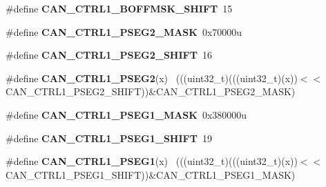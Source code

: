 \begin{DoxyCompactItemize}
\item 
\hypertarget{group___c_a_n___register___masks_ga9f3df553dda57c9cb36c599ee20bc598}{}\#define {\bfseries C\+A\+N\+\_\+\+C\+T\+R\+L1\+\_\+\+B\+O\+F\+F\+M\+S\+K\+\_\+\+S\+H\+I\+F\+T}~15\label{group___c_a_n___register___masks_ga9f3df553dda57c9cb36c599ee20bc598}

\item 
\hypertarget{group___c_a_n___register___masks_ga204a1f6435e791f02d599543020b4b15}{}\#define {\bfseries C\+A\+N\+\_\+\+C\+T\+R\+L1\+\_\+\+P\+S\+E\+G2\+\_\+\+M\+A\+S\+K}~0x70000u\label{group___c_a_n___register___masks_ga204a1f6435e791f02d599543020b4b15}

\item 
\hypertarget{group___c_a_n___register___masks_ga667a8faa98245aa9fa5afc6e71b7f640}{}\#define {\bfseries C\+A\+N\+\_\+\+C\+T\+R\+L1\+\_\+\+P\+S\+E\+G2\+\_\+\+S\+H\+I\+F\+T}~16\label{group___c_a_n___register___masks_ga667a8faa98245aa9fa5afc6e71b7f640}

\item 
\hypertarget{group___c_a_n___register___masks_gaca5a6aa4c0a109e51dc0b26f59b840a4}{}\#define {\bfseries C\+A\+N\+\_\+\+C\+T\+R\+L1\+\_\+\+P\+S\+E\+G2}(x)                                          ~(((uint32\+\_\+t)(((uint32\+\_\+t)(x))$<$$<$C\+A\+N\+\_\+\+C\+T\+R\+L1\+\_\+\+P\+S\+E\+G2\+\_\+\+S\+H\+I\+F\+T))\&C\+A\+N\+\_\+\+C\+T\+R\+L1\+\_\+\+P\+S\+E\+G2\+\_\+\+M\+A\+S\+K)\label{group___c_a_n___register___masks_gaca5a6aa4c0a109e51dc0b26f59b840a4}

\item 
\hypertarget{group___c_a_n___register___masks_gac32963f42638264064b58687c249c994}{}\#define {\bfseries C\+A\+N\+\_\+\+C\+T\+R\+L1\+\_\+\+P\+S\+E\+G1\+\_\+\+M\+A\+S\+K}~0x380000u\label{group___c_a_n___register___masks_gac32963f42638264064b58687c249c994}

\item 
\hypertarget{group___c_a_n___register___masks_gab92532aaca53b7fae9c2d9d7186e3a91}{}\#define {\bfseries C\+A\+N\+\_\+\+C\+T\+R\+L1\+\_\+\+P\+S\+E\+G1\+\_\+\+S\+H\+I\+F\+T}~19\label{group___c_a_n___register___masks_gab92532aaca53b7fae9c2d9d7186e3a91}

\item 
\hypertarget{group___c_a_n___register___masks_ga1982e1c68b1837d71d6c39be8e5f21b4}{}\#define {\bfseries C\+A\+N\+\_\+\+C\+T\+R\+L1\+\_\+\+P\+S\+E\+G1}(x)                                          ~(((uint32\+\_\+t)(((uint32\+\_\+t)(x))$<$$<$C\+A\+N\+\_\+\+C\+T\+R\+L1\+\_\+\+P\+S\+E\+G1\+\_\+\+S\+H\+I\+F\+T))\&C\+A\+N\+\_\+\+C\+T\+R\+L1\+\_\+\+P\+S\+E\+G1\+\_\+\+M\+A\+S\+K)\label{group___c_a_n___register___masks_ga1982e1c68b1837d71d6c39be8e5f21b4}


\end{DoxyCompactItemize}
